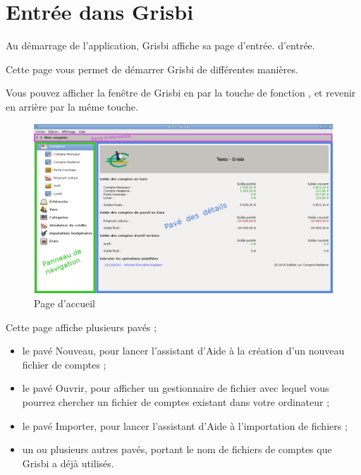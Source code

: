 
\chapter{Entrée dans Grisbi\label{entrance}}


Au démarrage de l'application, Grisbi affiche sa page 
\ifIllustration d'entrée.
\else d'entrée.
\fi


Cette page vous permet de démarrer Grisbi de différentes manières.


Vous pouvez afficher la fenêtre de Grisbi en  par la touche de fonction , et revenir en arrière par la même touche.

\ifIllustration
\begin{figure}[htbp]
\begin{center}
\includegraphics[scale=0.35]{image/screenshot/home}
\end{center}
\caption{Page d'accueil}
\label{home-img}
\end{figure}
\fi


Cette page affiche plusieurs pavés ;

\begin{itemize}
	 \item le pavé Nouveau, pour lancer l'assistant d'Aide à la création d'un nouveau fichier de comptes ;
	 \item le pavé Ouvrir, pour afficher un gestionnaire de fichier avec lequel vous pourrez chercher un fichier de comptes existant dans votre ordinateur ;
	 \item le pavé Importer, pour lancer l'assistant d'Aide à l'importation de fichiers ;
	 \item un ou plusieurs autres pavés, portant le nom de fichiers de comptes que Grisbi a déjà utilisés.
\end{itemize}


